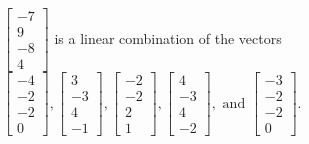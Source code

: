 \begin{exercise}
\begin{exerciseStatement}
  \end{exerciseStatement}
  \begin{exerciseAnswer}
   \(\left[\begin{array}{c}
-7 \\
9 \\
-8 \\
4
\end{array}\right]\) 
  	 is  
	a linear combination of the vectors \(\left[\begin{array}{c}
-4 \\
-2 \\
-2 \\
0
\end{array}\right] , \left[\begin{array}{c}
3 \\
-3 \\
4 \\
-1
\end{array}\right] , \left[\begin{array}{c}
-2 \\
-2 \\
2 \\
1
\end{array}\right] , \left[\begin{array}{c}
4 \\
-3 \\
4 \\
-2
\end{array}\right] , \text{ and } \left[\begin{array}{c}
-3 \\
-2 \\
-2 \\
0
\end{array}\right]\).

	
  


  \end{exerciseAnswer}
\end{exercise}